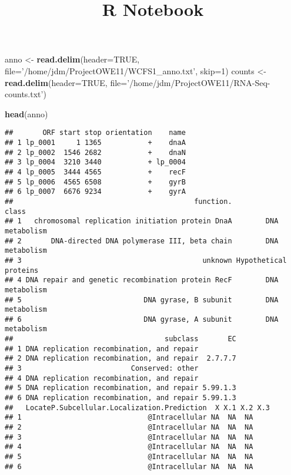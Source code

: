 \documentclass[]{article}
\title{R Notebook}
\author{}
\date{}
\newenvironment{Shaded}{\begin{snugshade}}{\end{snugshade}}
\newcommand{\KeywordTok}[1]{\textcolor[rgb]{0.13,0.29,0.53}{\textbf{#1}}}
\newcommand{\DataTypeTok}[1]{\textcolor[rgb]{0.13,0.29,0.53}{#1}}
\newcommand{\DecValTok}[1]{\textcolor[rgb]{0.00,0.00,0.81}{#1}}
\newcommand{\StringTok}[1]{\textcolor[rgb]{0.31,0.60,0.02}{#1}}
\newcommand{\OtherTok}[1]{\textcolor[rgb]{0.56,0.35,0.01}{#1}}
\newcommand{\NormalTok}[1]{#1}
\begin{document}
\maketitle

\begin{Shaded}
\begin{Highlighting}[]
\NormalTok{anno <-}\StringTok{ }\KeywordTok{read.delim}\NormalTok{(}\DataTypeTok{header=}\OtherTok{TRUE}\NormalTok{, }\DataTypeTok{file=}\StringTok{'/home/jdm/ProjectOWE11/WCFS1_anno.txt'}\NormalTok{, }\DataTypeTok{skip=}\DecValTok{1}\NormalTok{)}
\NormalTok{counts <-}\StringTok{ }\KeywordTok{read.delim}\NormalTok{(}\DataTypeTok{header=}\OtherTok{TRUE}\NormalTok{, }\DataTypeTok{file=}\StringTok{'/home/jdm/ProjectOWE11/RNA-Seq-counts.txt'}\NormalTok{)}

\KeywordTok{head}\NormalTok{(anno)}
\end{Highlighting}
\end{Shaded}

\begin{verbatim}
##       ORF start stop orientation    name
## 1 lp_0001     1 1365           +    dnaA
## 2 lp_0002  1546 2682           +    dnaN
## 3 lp_0004  3210 3440           + lp_0004
## 4 lp_0005  3444 4565           +    recF
## 5 lp_0006  4565 6508           +    gyrB
## 6 lp_0007  6676 9234           +    gyrA
##                                           function.                 class
## 1   chromosomal replication initiation protein DnaA        DNA metabolism
## 2       DNA-directed DNA polymerase III, beta chain        DNA metabolism
## 3                                           unknown Hypothetical proteins
## 4 DNA repair and genetic recombination protein RecF        DNA metabolism
## 5                             DNA gyrase, B subunit        DNA metabolism
## 6                             DNA gyrase, A subunit        DNA metabolism
##                                    subclass       EC
## 1 DNA replication recombination, and repair         
## 2 DNA replication recombination, and repair  2.7.7.7
## 3                          Conserved: other         
## 4 DNA replication recombination, and repair         
## 5 DNA replication recombination, and repair 5.99.1.3
## 6 DNA replication recombination, and repair 5.99.1.3
##   LocateP.Subcellular.Localization.Prediction  X X.1 X.2 X.3
## 1                              @Intracellular NA  NA  NA    
## 2                              @Intracellular NA  NA  NA    
## 3                              @Intracellular NA  NA  NA    
## 4                              @Intracellular NA  NA  NA    
## 5                              @Intracellular NA  NA  NA    
## 6                              @Intracellular NA  NA  NA
\end{verbatim}
\end{document}
